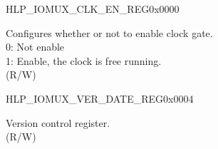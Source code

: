 \begin{register}{H}{LP\_IOMUX\_CLK\_EN\_REG}{0x0000}\label{regdesc:LPIOMUXCLKENREG}
%
%
\regnewline%
\begin{regdesc}\begin{reglist}
\label{fielddesc:LPIOMUXCLKEN}\item [LP\_IOMUX\_CLK\_EN] Configures whether or not to enable clock gate.\\
0: Not enable\\
1: Enable, the clock is free running. \\
(R/W)
\end{reglist}\end{regdesc}
\end{register}


\begin{register}{H}{LP\_IOMUX\_VER\_DATE\_REG}{0x0004}\label{regdesc:LPIOMUXVERDATEREG}
%
%
\regnewline%
\begin{regdesc}\begin{reglist}
\label{fielddesc:LPIOMUXVERDATE}\item [LP\_IOMUX\_VER\_DATE]  Version control register. \\
(R/W)
\end{reglist}\end{regdesc}
\end{register}


